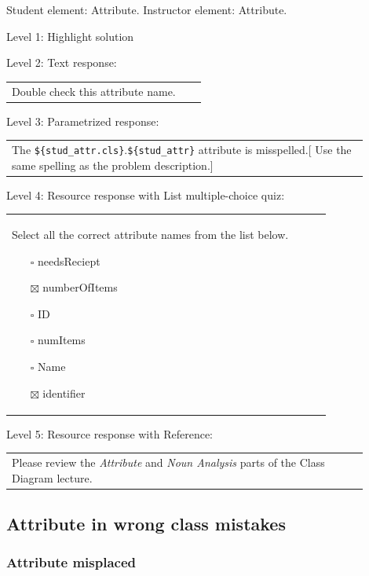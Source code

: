 Student element: Attribute. Instructor element: Attribute. \medskip

\noindent Level 1: Highlight solution  \medskip

\noindent Level 2: Text response: \medskip

\begin{tabular}{|p{0.9\linewidth}}
Double check this attribute name.
\end{tabular} \medskip

\noindent Level 3: Parametrized response: \medskip

\begin{tabular}{|p{0.9\linewidth}}
The \verb|${stud_attr.cls}|.\verb|${stud_attr}| attribute is misspelled.[ Use the same spelling as the problem description.]
\end{tabular} \medskip

\noindent Level 4: Resource response with List multiple-choice quiz: \medskip

\begin{tabular}{|p{0.9\linewidth}}

Select all the correct attribute names from the list below.

\begin{itemize}
    \item[$\square$] needsReciept
    \item[$\boxtimes$] numberOfItems
    \item[$\square$] ID
    \item[$\square$] numItems
    \item[$\square$] Name
    \item[$\boxtimes$] identifier
\end{itemize}

\end{tabular} \medskip

\noindent Level 5: Resource response with Reference: \medskip

\begin{tabular}{|p{0.9\linewidth}}
Please review the \textit{Attribute} and \textit{Noun Analysis} parts of the Class Diagram lecture.
\end{tabular} \medskip


\subsection{Attribute in wrong class mistakes}

\subsubsection{Attribute misplaced}

